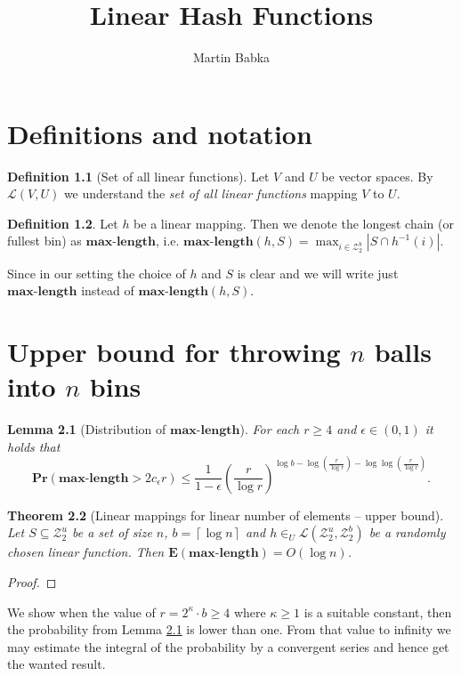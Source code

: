 \documentclass[12pt,notitlepage]{report}
\title{Linear Hash Functions}
\author{Martin Babka}
\theoremstyle{definition}
\newtheorem{definition}{Definition}
\theoremstyle{plain}
\newtheorem{theorem}[definition]{Theorem}
\newtheorem{lemma}[definition]{Lemma}
\newcommand{\Prob}[1]{\mathbf{Pr}\left(#1\right)}
\newcommand{\Expect}[1]{\mathbf{E}\left(#1\right)}
\newcommand{\maxlength}{\mathbf{max\mbox{-}length}}
\begin{document}
\chapter{Definitions and notation}
\begin{definition}[Set of all linear functions]
Let $V$ and $U$ be vector spaces. By $\mathcal{L}(V, U)$ we understand the \emph{set of all linear functions} mapping $V$ to $U$.
\end{definition}

\begin{definition}
Let $h$ be a linear mapping. Then we denote the longest chain (or fullest bin) as $\maxlength$, i.e. $\maxlength(h, S) = \operatorname{max}_{i \in \mathcal{Z}_{2}^b} |S \cap h^{-1}(i)|$.
\end{definition}

Since in our setting the choice of $h$ and $S$ is clear and we will write just $\maxlength$ instead of $\maxlength(h, S)$.

\chapter{Upper bound for throwing $n$ balls into $n$ bins}

\begin{lemma}[Distribution of $\maxlength$]
\label{lemma-distrib-maxlength-linear}
For each $r \geq 4$ and $\epsilon \in (0, 1)$ it holds that
\[
\Prob{\maxlength > 2c_\epsilon r} \leq \frac{1}{1 - \epsilon} \left(\frac{r}{\log r}\right)^{\log b - \log \left(\frac{r}{\log r}\right) - \log \log \left(\frac{r}{\log r}\right)}.
\]
\end{lemma}

\begin{theorem}[Linear mappings for linear number of elements -- upper bound]
Let $S \subseteq \mathcal{Z}_{2}^u$ be a set of size $n$, $b = \left\lceil \log n \right\rceil$ and $h \in_{U} \mathcal{L}(\mathcal{Z}_{2}^u, \mathcal{Z}_{2}^b)$ be a randomly chosen linear function. Then $\Expect{\maxlength} = O(\log n)$.
\end{theorem}
\begin{proof}
\end{proof}

We show when the value of $r = 2^{\kappa} \cdot b \geq 4$ where $\kappa \geq 1$ is a suitable constant, then the probability from Lemma \ref{lemma-distrib-maxlength-linear} is lower than one.
From that value to infinity we may estimate the integral of the probability by a convergent series and hence get the wanted result.
\end{document}

